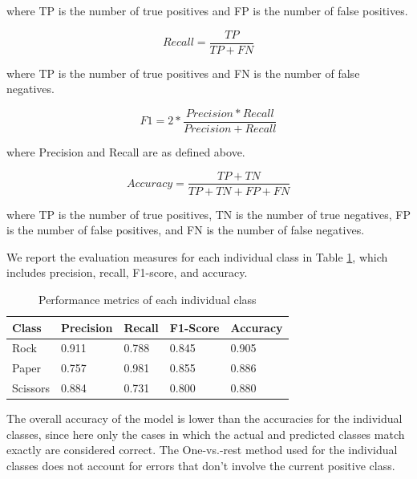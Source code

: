\documentclass[a4paper]{article}
\begin{document}
where TP is the number of true positives and FP is the number of false positives.

\begin{equation}
	Recall = \frac{TP}{TP + FN}
\end{equation}

where TP is the number of true positives and FN is the number of false negatives.

\begin{equation}
	F1 = 2 * \frac{Precision * Recall}{Precision + Recall}
\end{equation}

where Precision and Recall are as defined above.

\begin{equation}
	Accuracy = \frac{TP + TN}{TP + TN + FP + FN}
\end{equation}

where TP is the number of true positives, TN is the number of true negatives, FP is the number of false positives, and FN is the number of false negatives.
\newline

We report the evaluation measures for each individual class in Table \ref{tbl:metrics_model}, which includes precision, recall, F1-score, and accuracy.

\begin{table}[h]
	\centering
	\caption{Performance metrics of each individual class}
	\label{tbl:metrics_model}
	\begin{tabular}{@{}lllll@{}}
		\toprule
		Class    & Precision & Recall & F1-Score & Accuracy \\ \midrule
		Rock     & 0.911     & 0.788  & 0.845    & 0.905    \\
		Paper    & 0.757     & 0.981  & 0.855    & 0.886    \\
		Scissors & 0.884     & 0.731  & 0.800    & 0.880    \\ \bottomrule
	\end{tabular}
\end{table}


The overall accuracy of the model is lower than the accuracies for the individual classes, since here only the cases in which the actual and predicted classes match exactly are considered correct. The One-vs.-rest method used for the individual classes does not account for errors that don't involve the current positive class.
\end{document}
